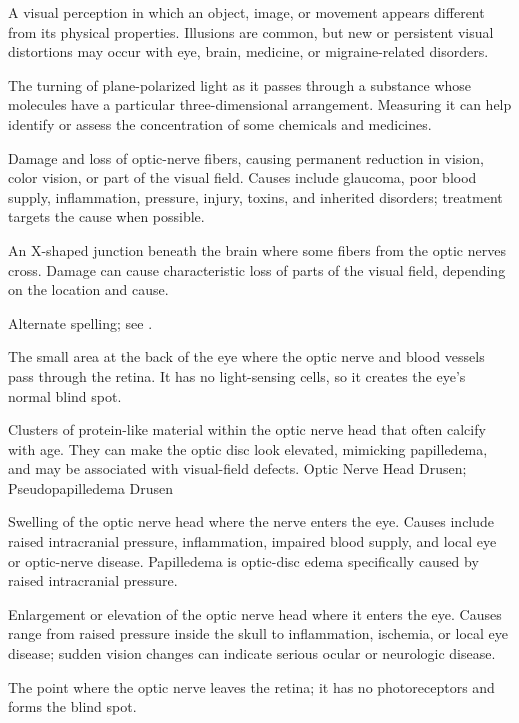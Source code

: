  A visual perception in which an object, image, or movement appears different from its physical properties. Illusions are common, but new or persistent visual distortions may occur with eye, brain, medicine, or migraine-related disorders.

 The turning of plane-polarized light as it passes through a substance whose molecules have a particular three-dimensional arrangement. Measuring it can help identify or assess the concentration of some chemicals and medicines.

 Damage and loss of optic-nerve fibers, causing permanent reduction in vision, color vision, or part of the visual field. Causes include glaucoma, poor blood supply, inflammation, pressure, injury, toxins, and inherited disorders; treatment targets the cause when possible.

 An X-shaped junction beneath the brain where some fibers from the optic nerves cross. Damage can cause characteristic loss of parts of the visual field, depending on the location and cause.

 Alternate spelling; see .

 The small area at the back of the eye where the optic nerve and blood vessels pass through the retina. It has no light-sensing cells, so it creates the eye’s normal blind spot.

 Clusters of protein-like material within the optic nerve head that often calcify with age. They can make the optic disc look elevated, mimicking papilledema, and may be associated with visual-field defects.
\synonyms
Optic Nerve Head Drusen; Pseudopapilledema Drusen

 Swelling of the optic nerve head where the nerve enters
the eye. Causes include raised intracranial pressure, inflammation, impaired blood
supply, and local eye or optic-nerve disease. Papilledema is optic-disc edema
specifically caused by raised intracranial pressure.

 Enlargement or elevation of the optic nerve head where it enters the eye. Causes range from raised pressure inside the skull to inflammation, ischemia, or local eye disease; sudden vision changes can indicate serious ocular or neurologic disease.

 The point where the optic nerve leaves the retina; it has no photoreceptors and forms the blind spot.

